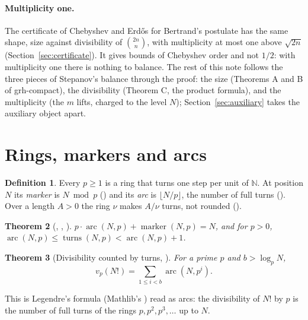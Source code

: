 \documentclass[11pt]{article}
\newtheorem{theorem}{Theorem}[section]
\theoremstyle{definition}
\newtheorem{definition}[theorem]{Definition}
\theoremstyle{remark}
\begin{document}
\paragraph{Multiplicity one.} The certificate of Chebyshev and Erdős for Bertrand's postulate has
the same shape, size against divisibility of $\binom{2n}{n}$, with multiplicity at most one above
$\sqrt{2n}$ (Section~\ref{sec:certificate}). It gives bounds of Chebyshev order and not $1/2$: with
multiplicity one there is nothing to balance. The rest of this note follows the three pieces of
Stepanov's balance through the proof: the size (Theorems A and B of grh-compact), the
divisibility (Theorem C, the product formula), and the multiplicity (the $m$ lifts, charged to the
level $N$); Section~\ref{sec:auxiliary} takes the auxiliary object apart.

\section{Rings, markers and arcs}\label{sec:rings}

\begin{definition}
Every $p\ge1$ is a ring that turns one step per unit of $\mathbb N$. At position $N$ its
\emph{marker} is $N\bmod p$ () and its \emph{arc} is $\lfloor N/p\rfloor$,
the number of full turns (). Over a length $A>0$ the ring $\nu$ makes
$A/\nu$ turns, not rounded ().
\end{definition}

\begin{theorem}[, ,
]
$p\cdot\operatorname{arc}(N,p)+\operatorname{marker}(N,p)=N$, and for $p>0$,
$\operatorname{arc}(N,p)\le \operatorname{turns}(N,p)<\operatorname{arc}(N,p)+1$.
\end{theorem}

\begin{theorem}[Divisibility counted by turns, ]
For a prime $p$ and $b>\log_p N$,
\[
v_p(N!)=\sum_{1\le i<b}\operatorname{arc}(N,p^i).
\]
\end{theorem}
This is Legendre's formula (Mathlib's ) read as arcs: the divisibility
of $N!$ by $p$ is the number of full turns of the rings $p,p^2,p^3,\dots$ up to $N$.
\end{document}
